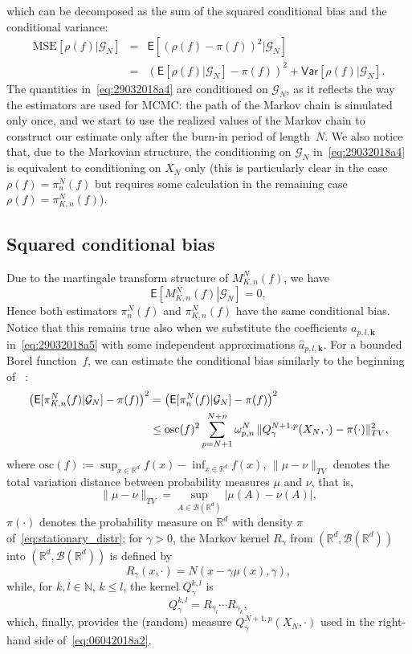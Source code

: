 \documentclass[article]{elsarticle}
\begin{document}
which can be decomposed as the sum of the squared conditional bias
and the conditional variance:
\begin{eqnarray}\label{eq:29032018a4}
\mathrm{MSE}\left[\rho(f)|\mathcal G_N\right]
&=&\mathsf{E}\left[(\rho(f)-\pi(f))^2|\mathcal G_N\right]
\\
\nonumber
&=&\left(\mathsf{E}[\rho(f)|\mathcal G_N]-\pi(f)\right)^2
+\mathsf{Var}\left[\rho(f)|\mathcal G_N\right].
\end{eqnarray}
The quantities in~\eqref{eq:29032018a4}
are conditioned on $\mathcal G_N$,
as it reflects the way the estimators are used for MCMC:
the path of the Markov chain is simulated only once,
and we start to use the realized values
of the Markov chain to construct
our estimate only after the burn-in period of length~$N$.
We also notice that, due to the Markovian structure,
the conditioning on $\mathcal G_N$
in~\eqref{eq:29032018a4}
is equivalent to conditioning on $X_N$ only
(this is particularly clear in the case $\rho(f)=\pi_n^N(f)$
but requires some calculation
in the remaining case $\rho(f)=\pi_{K,n}^N(f)$).


\subsection{Squared conditional bias}
Due to the martingale transform structure
of $M_{K,n}^N(f)$,
we have
\[
\mathsf E\left[\left.M_{K,n}^N(f)\right|\mathcal G_N\right]=0,
\]
Hence both estimators
$\pi_n^N(f)$ and $\pi_{K,n}^N(f)$ have the same conditional bias.
Notice that this remains true also when we substitute
the coefficients $a_{p,l,\mathbf{k}}$ in~\eqref{eq:29032018a5}
with some independent approximations $\widehat a_{p,l,\mathbf{k}}.$ For a bounded Borel function~$f$,
we can estimate the conditional bias
similarly to the beginning of ~\cite[Section~4]{durmus:moulines:2017}:
\begin{align}
\left(\mathsf{E}[\pi_{K,n}^N(f)|\mathcal G_N]-\pi(f)\right)^2
&=\left(\mathsf{E}[\pi_{n}^N(f)|\mathcal G_N]-\pi(f)\right)^2
\label{eq:06042018a2}\\
&\le
\mathrm{osc}(f)^2
\sum_{p=N+1}^{N+n}
\omega_{p,n}^N\,
\|Q_\gamma^{N+1,p}(X_N,\cdot)-\pi(\cdot)\|_{TV}^2,
\notag
\end{align}
where
$\mathrm{osc}(f):=\sup_{x\in\mathbb R^d}f(x)-\inf_{x\in\mathbb R^d}f(x)$,
$\|\mu-\nu\|_{TV}$ denotes the total variation distance
between probability measures $\mu$ and $\nu$, that is,
$$
\|\mu-\nu\|_{TV}=\sup_{A\in\mathcal B(\mathbb R^d)}
|\mu(A)-\nu(A)|,
$$
$\pi(\cdot)$ denotes the probability measure on $\mathbb R^d$
with density $\pi$ of~\eqref{eq:stationary_distr};
for $\gamma>0$, the Markov kernel $R_\gamma$
from $(\mathbb R^d,\mathcal B(\mathbb R^d))$
into $(\mathbb R^d,\mathcal B(\mathbb R^d))$
is defined by
$$
R_\gamma(x,\cdot)=N\left(x-\gamma\mu(x),\gamma\right),
$$
while, for $k,l\in\mathbb N$, $k\le l$,
the kernel $Q_\gamma^{k,l}$ is
$$
Q_\gamma^{k,l}=R_{\gamma_l}\cdots R_{\gamma_k},
$$
which, finally, provides the (random) measure
$Q_\gamma^{N+1,p}(X_N,\cdot)$
used in the right-hand side of~\eqref{eq:06042018a2}.
\end{document}
